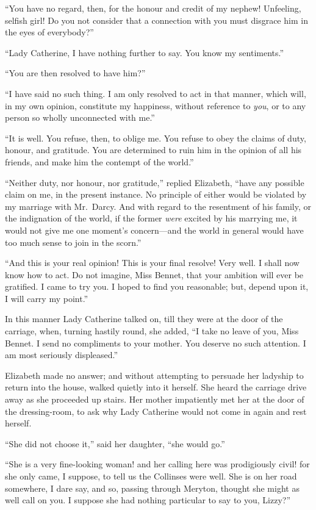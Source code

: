 ``You have no regard, then, for the honour and credit of my
nephew!  Unfeeling, selfish girl!  Do you not consider that
a connection with you must disgrace him in the eyes of
everybody?''

``Lady Catherine, I have nothing further to say.  You know my
sentiments.''

``You are then resolved to have him?''

``I have said no such thing.  I am only resolved to act in that
manner, which will, in my own opinion, constitute my happiness,
without reference to \emph{you}, or to any person so wholly unconnected
with me.''

``It is well.  You refuse, then, to oblige me.  You refuse to
obey the claims of duty, honour, and gratitude.  You are
determined to ruin him in the opinion of all his friends,
and make him the contempt of the world.''

``Neither duty, nor honour, nor gratitude,'' replied Elizabeth,
``have any possible claim on me, in the present instance.  No
principle of either would be violated by my marriage with
Mr.\ Darcy.  And with regard to the resentment of his family, or
the indignation of the world, if the former \emph{were} excited by his
marrying me, it would not give me one moment's concern---and
the world in general would have too much sense to join in the
scorn.''

``And this is your real opinion!  This is your final resolve!
Very well.  I shall now know how to act.  Do not imagine, Miss
Bennet, that your ambition will ever be gratified.  I came to
try you.  I hoped to find you reasonable; but, depend upon it,
I will carry my point.''

In this manner Lady Catherine talked on, till they were at the
door of the carriage, when, turning hastily round, she added,
``I take no leave of you, Miss Bennet.  I send no compliments to
your mother.  You deserve no such attention.  I am most
seriously displeased.''

Elizabeth made no answer; and without attempting to persuade
her ladyship to return into the house, walked quietly into it
herself.  She heard the carriage drive away as she proceeded
up stairs.  Her mother impatiently met her at the door of the
dressing-room, to ask why Lady Catherine would not come in
again and rest herself.

``She did not choose it,'' said her daughter, ``she would go.''

``She is a very fine-looking woman! and her calling here was
prodigiously civil! for she only came, I suppose, to tell us
the Collinses were well.  She is on her road somewhere, I dare
say, and so, passing through Meryton, thought she might as well
call on you.  I suppose she had nothing particular to say to
you, Lizzy?''

